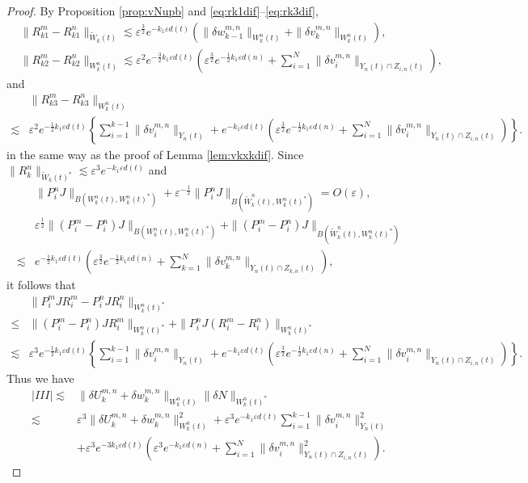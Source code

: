 \documentclass[11pt]{amsart}
\theoremstyle{remark}
\numberwithin{equation}{section}
\begin{document}
\begin{proof}
By Proposition \ref{prop:vNupb} and \eqref{eq:rk1dif}--\eqref{eq:rk3dif}, 
\begin{align*}
  & \|R_{k1}^m-R_{k1}^n\|_{\widetilde{W}_k(t)} \lesssim 
{\varepsilon}^{\frac32}e^{-k_1{\varepsilon} d(t)}(\|{\delta w}^{m,n}_{k-1}\|_{W_k^n(t)}+\|{\delta v}_k^{m,n}\|_{W_k^n(t)}),
\\ & \|R_{k2}^m-R_{k2}^n\|_{W_k^n(t)} \lesssim 
{\varepsilon}^2e^{-\frac32k_1{\varepsilon} d(t)} \left({\varepsilon}^{\frac32}e^{-\frac12k_1{\varepsilon} d(n)}
+\sum_{i=1}^N \|{\delta v}_i^{m,n}\|_{Y_n(t)\cap Z_{i,n}(t)}\right),
\end{align*}
and
\begin{align*}
& \|R_{k3}^m-R_{k3}^n\|_{W_k^n(t)} \\ \lesssim & 
{\varepsilon}^2e^{-\frac12k_1{\varepsilon} d(t)}\left\{\sum_{i=1}^{k-1}\|{\delta v}_i^{m,n}\|_{Y_n(t)}
+e^{-k_1{\varepsilon} d(t)}\left({\varepsilon}^{\frac32}e^{-\frac12k_1{\varepsilon} d(n)}
+\sum_{i=1}^N \|{\delta v}_i^{m,n}\|_{Y_n(t)\cap Z_{i,n}(t)}\right)\right\}.
\end{align*}
in the same way as the proof of Lemma \ref{lem:vkxkdif}.
Since $\|R_k^n\|_{\widetilde{W}_k(t)^*}\lesssim {\varepsilon}^3e^{-k_1{\varepsilon} d(t)}$ and
\begin{align*}
& \|P_i^nJ\|_{B(W_k^n(t),W_k^n(t)^*)}+{\varepsilon}^{-\frac12}
\|P_i^nJ\|_{B(\widetilde{W}_k^n(t),W_k^n(t)^*)}=O({\varepsilon}),
\\ &  {\varepsilon}^{\frac12}\|(P_i^m-P_i^n)J\|_{B(W_k^n(t),W_k^n(t)^*)}
+\|(P_i^m-P_i^n)J\|_{B(\widetilde{W}_k^n(t),W_k^n(t)^*)}
\\ \lesssim & e^{-\frac12 k_1{\varepsilon} d(t)}\left({\varepsilon}^{\frac32}e^{-\frac12k_1{\varepsilon} d(n)}
+\sum_{k=1}^N \|{\delta v}_k^{m,n}\|_{Y_n(t)\cap Z_{k,n}(t)}\right),
\end{align*}
it follows that
\begin{align*}
&  \|P_i^mJR_i^m-P_i^nJR_i^n\|_{W_k^n(t)^*}\\ \le &
\|(P_i^m-P_i^n)JR_i^m\|_{W_k^n(t)^*}+\|P_i^nJ(R_i^m-R_i^n)\|_{W_k^n(t)^*}
\\ \lesssim & 
{\varepsilon}^3e^{-\frac12k_1{\varepsilon} d(t)} \left\{\sum_{i=1}^{k-1}\|{\delta v}_i^{m,n}\|_{Y_n(t)}
+e^{-k_1{\varepsilon} d(t)}\left({\varepsilon}^{\frac32}e^{-\frac12k_1{\varepsilon} d(n)}
+\sum_{i=1}^N \|{\delta v}_i^{m,n}\|_{Y_n(t)\cap Z_{i,n}(t)}\right)\right\}.
\end{align*}
Thus we have
\begin{equation}
  \label{eq:lemen3}
  \begin{split}
|III|\lesssim & \|{\delta U}_k^{m,n}+{\delta w}^{m,n}_k\|_{W_k^n(t)}\|\delta N\|_{W_k^n(t)^*}
\\ \lesssim &
{\varepsilon}^3\|{\delta U}_k^{m,n}+{\delta w}^{m,n}_k\|_{W_k^n(t)}^2
+{\varepsilon}^3e^{-k_1{\varepsilon} d(t)}\sum_{i=1}^{k-1}\|{\delta v}_i^{m,n}\|_{Y_n(t)}^2
\\ &
+{\varepsilon}^3e^{-3k_1{\varepsilon} d(t)}\left({\varepsilon}^3e^{-k_1{\varepsilon} d(n)}+
\sum_{i=1}^N \|{\delta v}_i^{m,n}\|_{Y_n(t)\cap Z_{i,n}(t)}^2\right). 
  \end{split}
\end{equation}


\end{proof}
\end{document}
